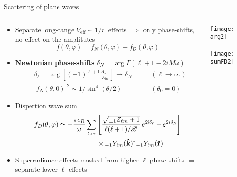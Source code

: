 \documentclass[9pt]{beamer}
\newcommand{\xDownarrow}[1]{%
	{\left\Downarrow\vbox to #1{}\right.\kern-\nulldelimiterspace}
}
\newcommand{\uu}[3][]{ {}_{#1} #2_{#3} }
\begin{document}
\begin{frame}{Scattering of plane waves}
	\begin{columns}[T]      
		\begin{column}{0.73\textwidth}
			\begin{itemize}
				\setlength\itemsep{1.2em}
				\item Separate long-range $V_\mathrm{eff} \sim 1/r~$ effects $ ~\Rightarrow$ only phase-shifts, no effect on the amplitutes
				$$ f(\theta,\varphi) = f_N(\theta,\varphi) + f_D(\theta,\varphi) $$

				\item \textbf{Newtonian phase-shifts} $\delta_N = \arg\Gamma(\ell+1-2 i M \omega)$
				\begin{alignat*}{3}
					&\delta_\ell = \arg\left[(-1)^{\ell+1}\frac{A_\mathrm{out}}{A_\mathrm{in}}\right] \longrightarrow \delta_N \qquad&(\ell\to\infty) \\
					&|f_N(\theta,0)|^2 \sim 1/\sin^4(\theta/2) & (\theta_0=0)
				\end{alignat*}

				\item Dispertion wave sum
				\begin{align*}
					f_D(\theta,\varphi) &\simeq - \frac{\pi \epsilon_R}{\omega} \sum_{\ell,m} \left[ \frac{\sqrt{ \uu[\pm 1]{Z}{\ell m} +1 }}{\ell(\ell+1)/\mathscr{B}} \, e^{2 i \delta_\ell } - e^{2 i \delta_\mathrm{N} } \right] \\
					& \hspace*{2cm}\times \uu[-1]{Y}{\ell m}(\mathbf{\hat{k}})^{*} \uu[-1]{Y}{\ell m}(\mathbf{\hat{r}})
				\end{align*}
				
				\item Superradiance effects masked from higher $\ell$ phase-shifts $\Rightarrow$ separate lower $\ell$ effects
			\end{itemize}
		\end{column}
		\begin{column}{0.4\textwidth}
			\texttt{[image: arg2]} \\[0.1cm]
			$\hspace{2.2cm}\xDownarrow{0.3cm}$ \\[0.1cm]
			\texttt{[image: sumFD2]}
		\end{column}
	\end{columns}
\end{frame}
\end{document}
